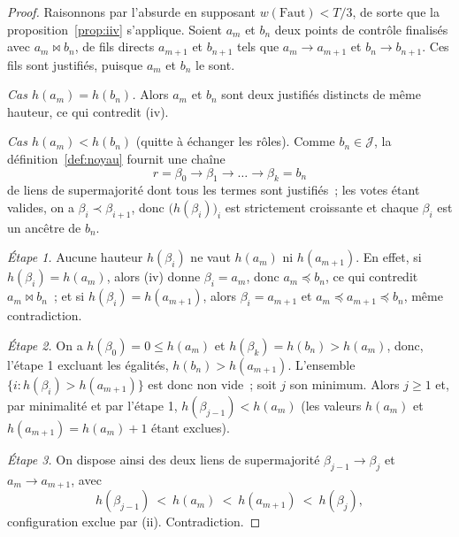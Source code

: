 \documentclass[11pt,a4paper]{article}
\theoremstyle{plain}
\theoremstyle{definition}
\newcommand{\Jj}{\mathcal{J}}
\newcommand{\anc}{\preccurlyeq}
\newcommand{\ancs}{\prec}
\begin{document}
\begin{proof}
Raisonnons par l'absurde en supposant $w(\mathrm{Faut})<T/3$, de sorte que la
proposition~\ref{prop:iiv} s'applique. Soient $a_m$ et $b_n$ deux points de contrôle
finalisés avec $a_m\bowtie b_n$, de fils directs $a_{m+1}$ et $b_{n+1}$ tels que
$a_m\to a_{m+1}$ et $b_n\to b_{n+1}$. Ces fils sont justifiés, puisque $a_m$ et $b_n$ le
sont.

\emph{Cas $h(a_m)=h(b_n)$.} Alors $a_m$ et $b_n$ sont deux justifiés distincts de même
hauteur, ce qui contredit (iv).

\emph{Cas $h(a_m)<h(b_n)$} (quitte à échanger les rôles). Comme $b_n\in\Jj$, la
définition~\ref{def:noyau} fournit une chaîne
\[ r=\beta_0\to\beta_1\to\dots\to\beta_k=b_n \]
de liens de supermajorité dont tous les termes sont justifiés~; les votes étant valides, on a
$\beta_i\ancs\beta_{i+1}$, donc $\big(h(\beta_i)\big)_i$ est strictement croissante et chaque
$\beta_i$ est un ancêtre de $b_n$.

\emph{Étape 1.} Aucune hauteur $h(\beta_i)$ ne vaut $h(a_m)$ ni $h(a_{m+1})$. En effet, si
$h(\beta_i)=h(a_m)$, alors (iv) donne $\beta_i=a_m$, donc $a_m\anc b_n$, ce qui contredit
$a_m\bowtie b_n$~; et si $h(\beta_i)=h(a_{m+1})$, alors $\beta_i=a_{m+1}$ et $a_m\anc
a_{m+1}\anc b_n$, même contradiction.

\emph{Étape 2.} On a $h(\beta_0)=0\le h(a_m)$ et $h(\beta_k)=h(b_n)>h(a_m)$, donc, l'étape 1
excluant les égalités, $h(b_n)>h(a_{m+1})$. L'ensemble $\{i : h(\beta_i)>h(a_{m+1})\}$ est
donc non vide~; soit $j$ son minimum. Alors $j\ge1$ et, par minimalité et par l'étape 1,
$h(\beta_{j-1})<h(a_m)$ (les valeurs $h(a_m)$ et $h(a_{m+1})=h(a_m)+1$ étant exclues).

\emph{Étape 3.} On dispose ainsi des deux liens de supermajorité $\beta_{j-1}\to\beta_j$ et
$a_m\to a_{m+1}$, avec
\[ h(\beta_{j-1})\ <\ h(a_m)\ <\ h(a_{m+1})\ <\ h(\beta_j), \]
configuration exclue par (ii). Contradiction.
\end{proof}
\end{document}
